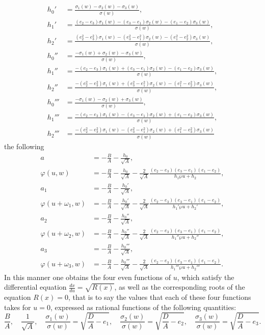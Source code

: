 \documentclass{article}
\begin{document}
\begin{equation}
    \tag{14}\label{eq:14}
\begin{aligned}
h_0' &= \frac{\sigma_1(w) - \sigma_2(w) - \sigma_3(w)}{\sigma(w)}, \\
h_1' &= \frac{(e_2 - e_3)\sigma_1(w) - (e_3 - e_1)\sigma_2(w) - (e_1 - e_2)\sigma_3(w)}{\sigma(w)}, \\
h_2' &= \frac{(e_2^2 - e_3^2)\sigma_1(w) - (e_3^2 - e_1^2)\sigma_2(w) - (e_1^2 - e_2^2)\sigma_3(w)}{\sigma(w)}, \\
h_0'' &= \frac{-\sigma_1(w) + \sigma_2(w) - \sigma_3(w)}{\sigma(w)}, \\
h_1'' &= \frac{-(e_2 - e_3)\sigma_1(w) + (e_3 - e_1)\sigma_2(w) - (e_1 - e_2)\sigma_3(w)}{\sigma(w)}, \\
h_2'' &= \frac{-(e_2^2 - e_3^2)\sigma_1(w) + (e_3^2 - e_1^2)\sigma_2(w) - (e_1^2 - e_2^2)\sigma_3(w)}{\sigma(w)}, \\
h_0''' &= \frac{-\sigma_1(w) - \sigma_2(w) + \sigma_3(w)}{\sigma(w)}, \\
h_1''' &= \frac{-(e_2 - e_3)\sigma_1(w) - (e_3 - e_1)\sigma_2(w) + (e_1 - e_2)\sigma_3(w)}{\sigma(w)}, \\
h_2''' &= \frac{-(e_2^2 - e_3^2)\sigma_1(w) - (e_3^2 - e_1^2)\sigma_2(w) + (e_1^2 - e_3^2)\sigma_3(w)}{\sigma(w)}
\end{aligned}
\end{equation}
the following
\begin{equation}
    \tag{15} %
\begin{aligned}
a &= -\frac{B}{A} - \frac{h_0}{\sqrt{A}}, \\
\varphi(u, w) &= -\frac{B}{A} - \frac{h_0}{\sqrt{A}} - \frac{2}{\sqrt{A}}\frac{(e_2 - e_3)(e_3 - e_1)(e_1 - e_2)}{h_1\wp u + h_2}, \\
a_1 &= -\frac{B}{A} - \frac{h_0'}{\sqrt{A}}, \\
\varphi(u + \omega_1, w) &= -\frac{B}{A} - \frac{h_0'}{\sqrt{A}} - \frac{2}{\sqrt{A}}\frac{(e_2 - e_3)(e_3 - e_1)(e_1 - e_2)}{h_1'\wp u + h_2'}, \\
a_2 &= -\frac{B}{A} - \frac{h_0''}{\sqrt{A}}, \\
\varphi(u + \omega_2, w) &= -\frac{B}{A} - \frac{h_0''}{\sqrt{A}} - \frac{2}{\sqrt{A}}\frac{(e_2 - e_3)(e_3 - e_1)(e_1 - e_2)}{h_1''\wp u + h_2''}, \\
a_3 &= -\frac{B}{A} - \frac{h_0'''}{\sqrt{A}}, \\
\varphi(u + \omega_3, w) &= -\frac{B}{A} - \frac{h_0'''}{\sqrt{A}} - \frac{2}{\sqrt{A}}\frac{(e_2 - e_3)(e_3 - e_1)(e_1 - e_2)}{h_1'''\wp u + h_2'''}.
\end{aligned}
\end{equation}
In this manner one obtains the four even functions of $u$, which satisfy the differential equation $\frac{dx}{du} = \sqrt{R(x)}$, as well as the corresponding roots of the equation $R(x) = 0$, that is to say the values that each of these four functions takes for $u = 0$, expressed as rational functions of the following quantities:
\[
\frac{B}{A}, \quad \frac{1}{\sqrt{A}}, \quad \frac{\sigma_1(w)}{\sigma(w)} = \sqrt{\frac{D}{A} - e_1}, \quad \frac{\sigma_2(w)}{\sigma(w)} = \sqrt{\frac{D}{A} - e_2}, \quad \frac{\sigma_3(w)}{\sigma(w)} = \sqrt{\frac{D}{A} - e_3}.
\]
\end{document}
